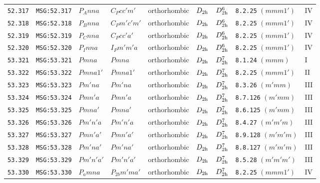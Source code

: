 \documentclass[fleqn,10pt]{jsarticle}
\begin{document}
\begin{center}
\begin{longtable}{lllllllll}
\texttt{52.317} & \texttt{MSG:52.317} & $P_{A}nna$ & $C_{P}cc'm'$ & orthorhombic & $D_{\rm 2h}$ & $D_{\rm 2h}^{6}$ & \texttt{8.2.25} $(mmm1')$ & IV \\
\texttt{52.318} & \texttt{MSG:52.318} & $P_{B}nna$ & $C_{P}m'c'm'$ & orthorhombic & $D_{\rm 2h}$ & $D_{\rm 2h}^{6}$ & \texttt{8.2.25} $(mmm1')$ & IV \\
\texttt{52.319} & \texttt{MSG:52.319} & $P_{C}nna$ & $C_{P}cc'a'$ & orthorhombic & $D_{\rm 2h}$ & $D_{\rm 2h}^{6}$ & \texttt{8.2.25} $(mmm1')$ & IV \\
\texttt{52.320} & \texttt{MSG:52.320} & $P_{I}nna$ & $I_{P}m'm'a$ & orthorhombic & $D_{\rm 2h}$ & $D_{\rm 2h}^{6}$ & \texttt{8.2.25} $(mmm1')$ & IV \\ \hline
\texttt{53.321} & \texttt{MSG:53.321} & $Pmna$ & $Pmna$ & orthorhombic & $D_{\rm 2h}$ & $D_{\rm 2h}^{7}$ & \texttt{8.1.24} $(mmm)$ & I \\
\texttt{53.322} & \texttt{MSG:53.322} & $Pmna1'$ & $Pmna1'$ & orthorhombic & $D_{\rm 2h}$ & $D_{\rm 2h}^{7}$ & \texttt{8.2.25} $(mmm1')$ & II \\
\texttt{53.323} & \texttt{MSG:53.323} & $Pm'na$ & $Pm'na$ & orthorhombic & $D_{\rm 2h}$ & $D_{\rm 2h}^{7}$ & \texttt{8.3.26} $(m'mm)$ & III \\
\texttt{53.324} & \texttt{MSG:53.324} & $Pmn'a$ & $Pmn'a$ & orthorhombic & $D_{\rm 2h}$ & $D_{\rm 2h}^{7}$ & \texttt{8.7.126} $(m'mm)$ & III \\
\texttt{53.325} & \texttt{MSG:53.325} & $Pmna'$ & $Pmna'$ & orthorhombic & $D_{\rm 2h}$ & $D_{\rm 2h}^{7}$ & \texttt{8.6.125} $(m'mm)$ & III \\
\texttt{53.326} & \texttt{MSG:53.326} & $Pm'n'a$ & $Pm'n'a$ & orthorhombic & $D_{\rm 2h}$ & $D_{\rm 2h}^{7}$ & \texttt{8.4.27} $(m'm'm)$ & III \\
\texttt{53.327} & \texttt{MSG:53.327} & $Pmn'a'$ & $Pmn'a'$ & orthorhombic & $D_{\rm 2h}$ & $D_{\rm 2h}^{7}$ & \texttt{8.9.128} $(m'm'm)$ & III \\
\texttt{53.328} & \texttt{MSG:53.328} & $Pm'na'$ & $Pm'na'$ & orthorhombic & $D_{\rm 2h}$ & $D_{\rm 2h}^{7}$ & \texttt{8.8.127} $(m'm'm)$ & III \\
\texttt{53.329} & \texttt{MSG:53.329} & $Pm'n'a'$ & $Pm'n'a'$ & orthorhombic & $D_{\rm 2h}$ & $D_{\rm 2h}^{7}$ & \texttt{8.5.28} $(m'm'm')$ & III \\
\texttt{53.330} & \texttt{MSG:53.330} & $P_{a}mna$ & $P_{2b}m'ma'$ & orthorhombic & $D_{\rm 2h}$ & $D_{\rm 2h}^{7}$ & \texttt{8.2.25} $(mmm1')$ & IV \\

\end{longtable}
\end{center}
\end{document}
